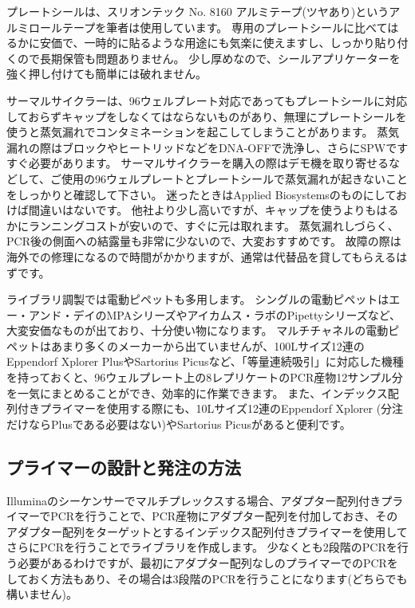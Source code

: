 \documentclass[titlepage,10pt,a4paper,uplatex]{jsbook}
\begin{document}
プレートシールは、スリオンテック No. 8160 アルミテープ(ツヤあり)というアルミロールテープを筆者は使用しています。
専用のプレートシールに比べてはるかに安価で、一時的に貼るような用途にも気楽に使えますし、しっかり貼り付くので長期保管も問題ありません。
少し厚めなので、シールアプリケーターを強く押し付けても簡単には破れません。

サーマルサイクラーは、96ウェルプレート対応であってもプレートシールに対応しておらずキャップをしなくてはならないものがあり、無理にプレートシールを使うと蒸気漏れでコンタミネーションを起こしてしまうことがあります。
蒸気漏れの際はブロックやヒートリッドなどをDNA-OFFで洗浄し、さらにSPWですすぐ必要があります。
サーマルサイクラーを購入の際はデモ機を取り寄せるなどして、ご使用の96ウェルプレートとプレートシールで蒸気漏れが起きないことをしっかりと確認して下さい。
迷ったときはApplied Biosystemsのものにしておけば間違いはないです。
他社より少し高いですが、キャップを使うよりもはるかにランニングコストが安いので、すぐに元は取れます。
蒸気漏れしづらく、PCR後の側面への結露量も非常に少ないので、大変おすすめです。
故障の際は海外での修理になるので時間がかかりますが、通常は代替品を貸してもらえるはずです。

ライブラリ調製では電動ピペットも多用します。
シングルの電動ピペットはエー・アンド・デイのMPAシリーズやアイカムス・ラボのPipettyシリーズなど、大変安価なものが出ており、十分使い物になります。
マルチチャネルの電動ピペットはあまり多くのメーカーから出ていませんが、100{\textmu}Lサイズ12連のEppendorf Xplorer PlusやSartorius Picusなど、「等量連続吸引」に対応した機種を持っておくと、96ウェルプレート上の8レプリケートのPCR産物12サンプル分を一気にまとめることができ、効率的に作業できます。
また、インデックス配列付きプライマーを使用する際にも、10{\textmu}Lサイズ12連のEppendorf Xplorer (分注だけならPlusである必要はない)やSartorius Picusがあると便利です。

\subsection{プライマーの設計と発注の方法}

Illuminaのシーケンサーでマルチプレックスする場合、アダプター配列付きプライマーでPCRを行うことで、PCR産物にアダプター配列を付加しておき、そのアダプター配列をターゲットとするインデックス配列付きプライマーを使用してさらにPCRを行うことでライブラリを作成します。
少なくとも2段階のPCRを行う必要があるわけですが、最初にアダプター配列なしのプライマーでのPCRをしておく方法もあり、その場合は3段階のPCRを行うことになります(どちらでも構いません)。
\end{document}
